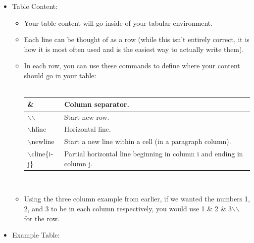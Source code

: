 \documentclass{article}
\begin{document}
\begin{itemize}
\begin{itemize}
						\item Tables in \LaTeX{} will not automatically wrap text in calls and will overrun the width of the page if long enough. For these columns that will contain long texts, it is recommended to use a paragraph column.
						\begin{itemize}
							\item To specify length of a paragraph column, you would include it using \{enter length here\}.
							\item Specifying a p column with a size of 5cm will look like this: p\{5cm\}
						\end{itemize}
					\end{itemize}
					\item Table Content:
					\begin{itemize}
						\item Your table content will go inside of your tabular environment.
						\item Each line can be thought of as a row (while this isn\rq{}t entirely correct, it is how it is most often used and is the easiest way to actually write them).
						\item In each row, you can use these commands to define where your content should go in your table:\\\\
						\def\arraystretch{1.4}
						\begin{tabularx}{\textwidth}{| l | X |}
							\hline
							\& & Column separator.\\
							\hline
							$\backslash$$\backslash$ & Start new row.\\
							\hline
							$\backslash$hline & Horizontal line.\\
							\hline
							$\backslash$newline & Start a new line within a cell (in a paragraph column).\\
							\hline
							$\backslash$cline\{i-j\} & Partial horizontal line beginning in column i and ending in column j.\\
							\hline
						\end{tabularx}\\
						\item Using the three column example from earlier, if we wanted the numbers 1, 2, and 3 to be in each column respectively, you would use 1 \& 2 \& 3$\backslash$$\backslash$ for the row.
					\end{itemize}
					\item  Example Table:\\\\

\end{itemize}
\end{document}
